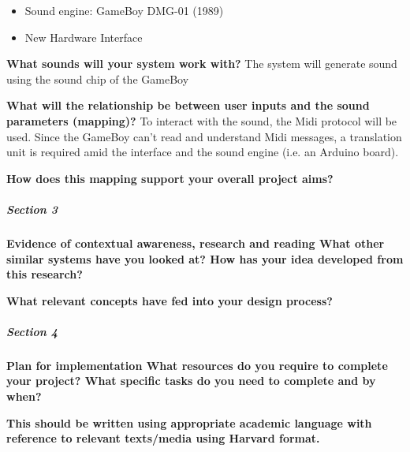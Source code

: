 \documentclass[]{article}
\begin{document}
        \begin{itemize}
            \item Sound engine: GameBoy DMG-01 (1989)
            \item New Hardware Interface
        \end{itemize}

    \textbf{What sounds will your system work with?}
    The system will generate sound using the sound chip of the GameBoy

    \textbf{What will the relationship be between user inputs and the sound 
    parameters (mapping)?} 
    To interact with the sound, the Midi protocol will be used.
    Since the GameBoy can't read and understand Midi messages,
    a translation unit is required amid the interface and the sound engine (i.e. an Arduino board).

    \textbf{How does this mapping support your overall project aims?}

\subparagraph[]{Section 3}

    \textbf{Evidence of contextual awareness, research and reading What other similar
    systems have you looked at? How has your idea developed from this research? }
    
    \textbf{What relevant concepts have fed into your design process?}

\subparagraph[]{Section 4}
    
    \textbf{Plan for implementation What resources do you require to complete your
    project? What specific tasks do you need to complete and by when?}

    \textbf{This should be written using appropriate academic language with reference
    to relevant texts/media using Harvard format.}



\end{document}
